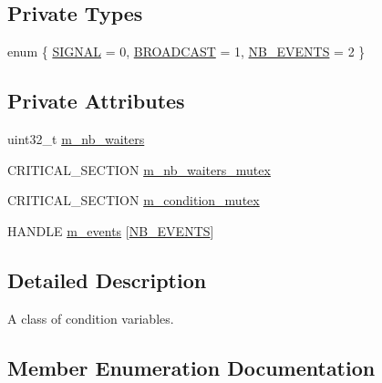 \subsection*{Private Types}
\begin{DoxyCompactItemize}
\item 
enum \{ \hyperlink{classmage_1_1_condition_variable_a14e9d213c294cc47b3341fccaf6b48e5a83361ddf52d1973875f7a48ac4bccf94}{S\+I\+G\+N\+AL} = 0, 
\hyperlink{classmage_1_1_condition_variable_a14e9d213c294cc47b3341fccaf6b48e5a5863233d3c1e62ca806753b0d175199f}{B\+R\+O\+A\+D\+C\+A\+ST} = 1, 
\hyperlink{classmage_1_1_condition_variable_a14e9d213c294cc47b3341fccaf6b48e5abc7182486d437f413ac9c77ae0bfdac1}{N\+B\+\_\+\+E\+V\+E\+N\+TS} = 2
 \}
\end{DoxyCompactItemize}
\subsection*{Private Attributes}
\begin{DoxyCompactItemize}
\item 
uint32\+\_\+t \hyperlink{classmage_1_1_condition_variable_ac02cb14000a597ec91b8546bdcbb9dd1}{m\+\_\+nb\+\_\+waiters}
\item 
C\+R\+I\+T\+I\+C\+A\+L\+\_\+\+S\+E\+C\+T\+I\+ON \hyperlink{classmage_1_1_condition_variable_a0686e682d62d44ff1eb9ac45acbb0eab}{m\+\_\+nb\+\_\+waiters\+\_\+mutex}
\item 
C\+R\+I\+T\+I\+C\+A\+L\+\_\+\+S\+E\+C\+T\+I\+ON \hyperlink{classmage_1_1_condition_variable_ab5ff870b2881a1979ccaec986d762441}{m\+\_\+condition\+\_\+mutex}
\item 
H\+A\+N\+D\+LE \hyperlink{classmage_1_1_condition_variable_ac61c3440af244ec43d2ad53026ec9de4}{m\+\_\+events} \mbox{[}\hyperlink{classmage_1_1_condition_variable_a14e9d213c294cc47b3341fccaf6b48e5abc7182486d437f413ac9c77ae0bfdac1}{N\+B\+\_\+\+E\+V\+E\+N\+TS}\mbox{]}
\end{DoxyCompactItemize}


\subsection{Detailed Description}
A class of condition variables. 

\subsection{Member Enumeration Documentation}
\hypertarget{classmage_1_1_condition_variable_a14e9d213c294cc47b3341fccaf6b48e5}{}\label{classmage_1_1_condition_variable_a14e9d213c294cc47b3341fccaf6b48e5} 
